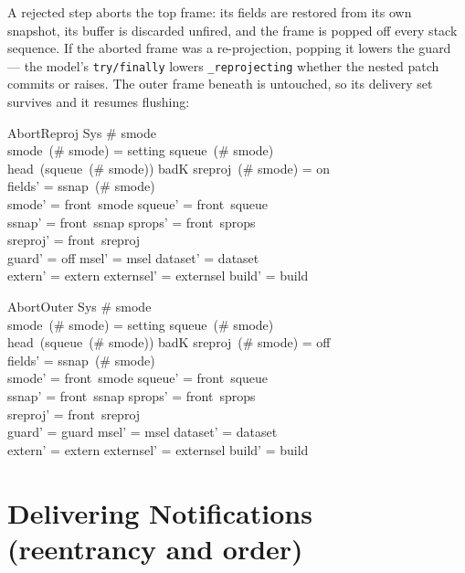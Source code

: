 \documentclass[a4paper,10pt,fleqn]{article}
\begin{document}
A rejected step aborts the top frame: its fields are restored from its own
snapshot, its buffer is discarded unfired, and the frame is popped off every
stack sequence.  If the aborted frame was a re-projection, popping it lowers the
guard --- the model's \texttt{try/finally} lowers \texttt{\_reprojecting} whether
the nested patch commits or raises.  The outer frame beneath is untouched, so its
delivery set survives and it resumes flushing:

\begin{schema}{AbortReproj}
  \Delta Sys
\where
  \# smode  \\
  smode~(\# smode) = setting \land squeue~(\# smode) \neq \langle \rangle \\
  head~(squeue~(\# smode)) \in \ran badK \land sreproj~(\# smode) = on \\
  fields' = ssnap~(\# smode) \\
  smode' = front~smode \land squeue' = front~squeue \\
  \land ssnap' = front~ssnap \land sprops' = front~sprops \\
  \land sreproj' = front~sreproj \\
  guard' = off \land msel' = msel \land dataset' = dataset \\
  \land extern' = extern \land externsel' = externsel \land build' = build
\end{schema}

\begin{schema}{AbortOuter}
  \Delta Sys
\where
  \# smode  \\
  smode~(\# smode) = setting \land squeue~(\# smode) \neq \langle \rangle \\
  head~(squeue~(\# smode)) \in \ran badK \land sreproj~(\# smode) = off \\
  fields' = ssnap~(\# smode) \\
  smode' = front~smode \land squeue' = front~squeue \\
  \land ssnap' = front~ssnap \land sprops' = front~sprops \\
  \land sreproj' = front~sreproj \\
  guard' = guard \land msel' = msel \land dataset' = dataset \\
  \land extern' = extern \land externsel' = externsel \land build' = build
\end{schema}

\section{Delivering Notifications (reentrancy and order)}
\label{sec:deliver}
\end{document}
